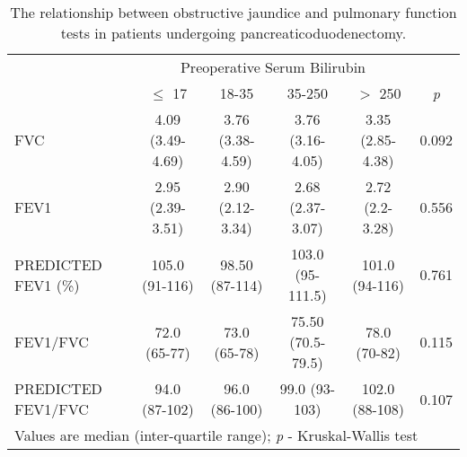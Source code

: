 \begin{sidewaystable}[p]
	\caption{The relationship  between obstructive jaundice and pulmonary function tests in patients undergoing pancreaticoduodenectomy.}
	\label{table:cpet_oj_pft}
	\centering
	\renewcommand{\arraystretch}{1.4} %
	\setlength{\tabcolsep}{9pt} %
	
	\begin{tabular}{|l| c c c c|c|}
		\hline
		                    &              \multicolumn{4}{c|}{Preoperative Serum Bilirubin}              &  \\
		                    & $\leq$ 17        & 18-35            & 35-250            & $>$ 250          & \textit{p} \\ \hline
		FVC                 & 4.09 (3.49-4.69) & 3.76 (3.38-4.59) & 3.76 (3.16-4.05)  & 3.35 (2.85-4.38) & 0.092      \\
		FEV1                & 2.95 (2.39-3.51) & 2.90 (2.12-3.34) & 2.68 (2.37-3.07)  & 2.72 (2.2-3.28)  & 0.556      \\
		PREDICTED FEV1 (\%) & 105.0 (91-116)   & 98.50 (87-114)   & 103.0 (95-111.5)  & 101.0 (94-116)   & 0.761      \\
		FEV1/FVC            & 72.0 (65-77)     & 73.0 (65-78)     & 75.50 (70.5-79.5) & 78.0 (70-82)     & 0.115      \\
		PREDICTED FEV1/FVC  & 94.0 (87-102)    & 96.0 (86-100)    & 99.0 (93-103)     & 102.0 (88-108)   & 0.107      \\ \hline
		\multicolumn{6}{l}{Values are median (inter-quartile range); \textit{p} - Kruskal-Wallis test}
	\end{tabular}
\end{sidewaystable}



